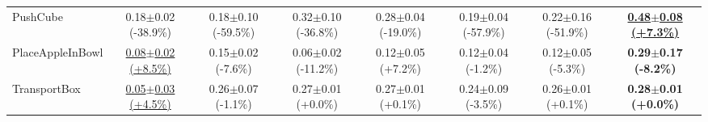 \begin{table}[htbp]
\begin{adjustbox}{max width=\textwidth}
\begin{tabular}{l*{7}{c}}
PushCube & 0.18$\pm$0.02 \scriptsize{(-38.9\%)} & 0.18$\pm$0.10 \scriptsize{(-59.5\%)} & 0.32$\pm$0.10 \scriptsize{(-36.8\%)} & 0.28$\pm$0.04 \scriptsize{(-19.0\%)} & 0.19$\pm$0.04 \scriptsize{(-57.9\%)} & 0.22$\pm$0.16 \scriptsize{(-51.9\%)} & \textbf{\underline{0.48$\pm$0.08 \scriptsize{(+7.3\%)}}} \\
PlaceAppleInBowl & \underline{0.08$\pm$0.02 \scriptsize{(+8.5\%)}} & 0.15$\pm$0.02 \scriptsize{(-7.6\%)} & 0.06$\pm$0.02 \scriptsize{(-11.2\%)} & 0.12$\pm$0.05 \scriptsize{(+7.2\%)} & 0.12$\pm$0.04 \scriptsize{(-1.2\%)} & 0.12$\pm$0.05 \scriptsize{(-5.3\%)} & \textbf{0.29$\pm$0.17 \scriptsize{(-8.2\%)}} \\
TransportBox & \underline{0.05$\pm$0.03 \scriptsize{(+4.5\%)}} & 0.26$\pm$0.07 \scriptsize{(-1.1\%)} & 0.27$\pm$0.01 \scriptsize{(+0.0\%)} & 0.27$\pm$0.01 \scriptsize{(+0.1\%)} & 0.24$\pm$0.09 \scriptsize{(-3.5\%)} & 0.26$\pm$0.01 \scriptsize{(+0.1\%)} & \textbf{0.28$\pm$0.01 \scriptsize{(+0.0\%)}} \\
\bottomrule
\end{tabular}
\end{adjustbox}
\end{table}

